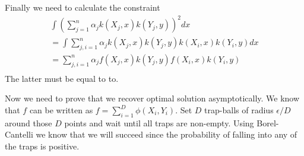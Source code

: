 \documentclass[10pt]{article}
\begin{document}
Finally we need to calculate the constraint
\begin{align}
 \int \left( \sum_{j=1}^{n} \alpha_j  k(X_{j},x)  k(Y_{j},y) \right )^2 dx \\ 
 = \int  \sum_{j,i=1}^{n} \alpha_j  k(X_{j},x)  k(Y_{j},y) k(X_{i},x)  k(Y_{i},y)  dx\\
 =   \sum_{j,i=1}^{n} \alpha_j  f(X_{j},x)  k(Y_{j},y) f(X_{i},x)  k(Y_{i},y)  \\
\end{align}
The latter must be equal to to.

Now we need to prove that we recover optimal solution asymptotically. We know that $f$ can be written as $f = \sum_{i=1}^{D} \phi(X_i,Y_i)$. Set $D$ trap-balls of radius $\epsilon/D$ around those $D$ points and wait until all traps are non-empty. Using Borel-Cantelli we know that we will succeed since the probability of falling into any of the traps is positive.          
\end{document}
